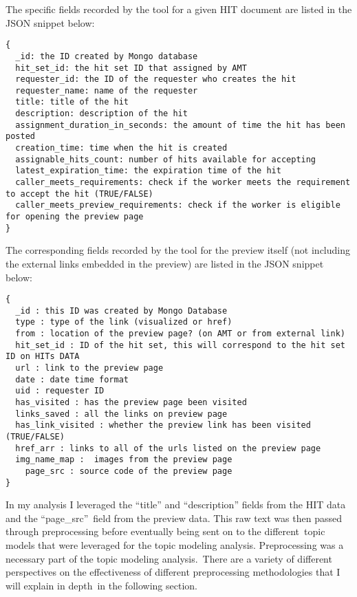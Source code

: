 \documentclass[letterpaper,12pt]{article}
\begin{document}
The specific fields recorded by the tool for a given HIT document are listed in the JSON snippet below:

\begin{lstlisting}
{	
  _id: the ID created by Mongo database
  hit_set_id: the hit set ID that assigned by AMT
  requester_id: the ID of the requester who creates the hit
  requester_name: name of the requester
  title: title of the hit
  description: description of the hit
  assignment_duration_in_seconds: the amount of time the hit has been posted
  creation_time: time when the hit is created
  assignable_hits_count: number of hits available for accepting
  latest_expiration_time: the expiration time of the hit
  caller_meets_requirements: check if the worker meets the requirement to accept the hit (TRUE/FALSE)
  caller_meets_preview_requirements: check if the worker is eligible for opening the preview page 
}
\end{lstlisting}

The corresponding fields recorded by the tool for the preview itself (not including the external links embedded in the preview) are listed in the JSON snippet below:\
\newpage

\begin{lstlisting}
{
  _id : this ID was created by Mongo Database
  type : type of the link (visualized or href)
  from : location of the preview page? (on AMT or from external link)
  hit_set_id : ID of the hit set, this will correspond to the hit set ID on HITs DATA
  url : link to the preview page
  date : date time format
  uid : requester ID
  has_visited : has the preview page been visited
  links_saved : all the links on preview page
  has_link_visited : whether the preview link has been visited (TRUE/FALSE)
  href_arr : links to all of the urls listed on the preview page
  img_name_map :  images from the preview page
	page_src : source code of the preview page
}	
\end{lstlisting}

In my analysis I leveraged the ``title'' and ``description'' fields from the HIT data and the ``page\_src''\
field from the preview data. This raw text was then passed through preprocessing before eventually being sent on to the different\
topic models that were leveraged for the topic modeling analysis. Preprocessing was a necessary part of the topic modeling analysis.\
There are a variety of different perspectives on the effectiveness of different preprocessing methodologies that I will explain in depth\
in the following section.
\end{document}
